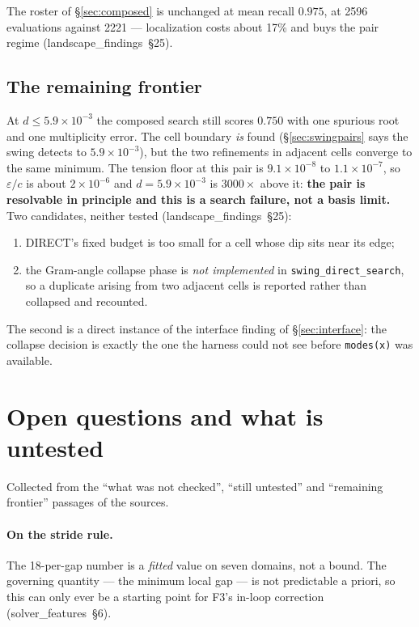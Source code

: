 \documentclass[11pt]{article}
\newcommand{\lf}[1]{(landscape\_findings~\S#1)}
\newcommand{\sfe}[1]{(solver\_features~\S#1)}
\begin{document}
The roster of \S\ref{sec:composed} is unchanged at mean recall $0.975$, at 2596 evaluations
against 2221 --- localization costs about 17\% and buys the pair regime \lf{25}.

\subsection{The remaining frontier}

At $d \le 5.9\times10^{-3}$ the composed search still scores $0.750$ with one spurious root and one
multiplicity error. The cell boundary \emph{is} found (\S\ref{sec:swingpairs} says the swing
detects to $5.9\times10^{-3}$), but the two refinements in adjacent cells converge to the same
minimum. The tension floor at this pair is $9.1\times10^{-8}$ to $1.1\times10^{-7}$, so
$\varepsilon/c$ is about $2\times10^{-6}$ and $d = 5.9\times10^{-3}$ is $3000\times$ above it:
\textbf{the pair is resolvable in principle and this is a search failure, not a basis limit.} Two
candidates, neither tested \lf{25}:
\begin{enumerate}[nosep]
\item DIRECT's fixed budget is too small for a cell whose dip sits near its edge;
\item the Gram-angle collapse phase is \emph{not implemented} in \verb|swing_direct_search|, so a
  duplicate arising from two adjacent cells is reported rather than collapsed and recounted.
\end{enumerate}
The second is a direct instance of the interface finding of \S\ref{sec:interface}: the collapse
decision is exactly the one the harness could not see before \verb|modes(x)| was available.

\section{Open questions and what is untested}
\label{sec:open}

Collected from the ``what was not checked'', ``still untested'' and ``remaining frontier''
passages of the sources.

\paragraph{On the stride rule.} The 18-per-gap number is a \emph{fitted} value on seven domains,
not a bound. The governing quantity --- the minimum local gap --- is not predictable a priori, so
this can only ever be a starting point for F3's in-loop correction \sfe{6}.
\end{document}
